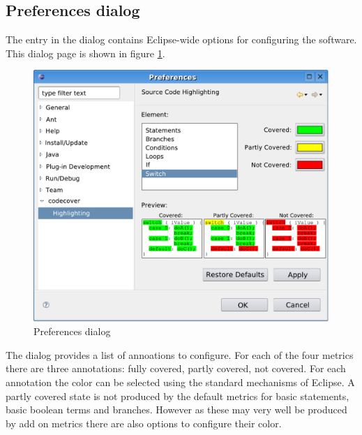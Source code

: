 \subsection{Preferences dialog} \label{ui:Preferences dialog}
The \gbt entry in the  dialog contains Eclipse-wide options for configuring the software. This dialog page is shown in figure \ref{ui_fg:Preferences dialog}.
\begin{figure}[hbt]
 \centering
 \includegraphics[width=1.0\textwidth]{images/Preferences_Highlighting/Preferences_Highlighting}
 \caption{Preferences dialog}
 \label{ui_fg:Preferences dialog}
\end{figure}
\par

The dialog provides a list of annoations to configure. For each of the four metrics there are three annotations: fully covered, partly covered, not covered. For each annotation the color can be selected using the standard mechanisms of Eclipse. A partly covered state is not produced by the default metrics for basic statements, basic boolean terms and branches. However as these may very well be produced by add on metrics there are also options to configure their color.

\newpage
